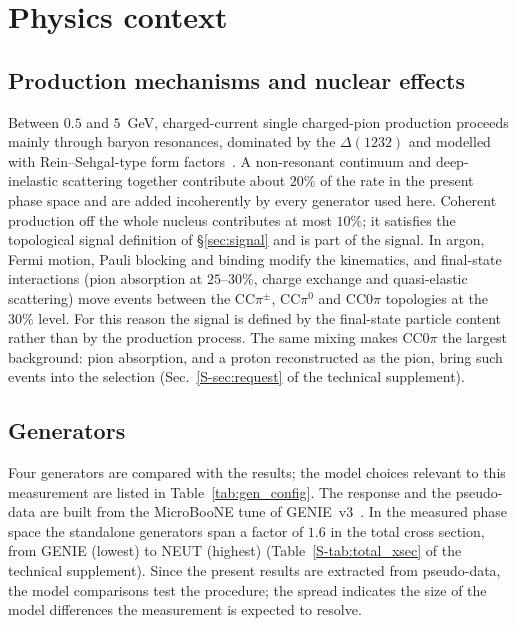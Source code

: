 \documentclass[11pt,a4paper]{article}
\newcommand{\uboone}{MicroBooNE}
\newcommand{\suppref}[2]{#1~\ref{S-#2} of the technical supplement}
\begin{document}
\section{Physics context}
\label{sec:theory}

\subsection{Production mechanisms and nuclear effects}
\label{sec:prod_mechanisms}
\label{sec:fsi}

Between $0.5$ and $5$~GeV, charged-current single charged-pion production proceeds mainly through
baryon resonances, dominated by the $\Delta(1232)$ and modelled with Rein--Sehgal-type form
factors~\cite{rs1981,kuzmin2004,graczyk2008,berger2007,nowak2009}. A non-resonant continuum and
deep-inelastic scattering together contribute about $20\%$ of the rate in the present phase space
and are added incoherently by every generator used here. Coherent production off the whole nucleus
contributes at most $10\%$; it satisfies the topological signal definition of \S\ref{sec:signal}
and is part of the signal. In argon, Fermi motion, Pauli blocking and binding modify the
kinematics, and final-state interactions (pion absorption at $25$--$30\%$, charge exchange and
quasi-elastic scattering) move events between the CC$\pi^{\pm}$, CC$\pi^0$ and CC$0\pi$ topologies
at the $30\%$ level. For this reason the signal is defined by the final-state particle content
rather than by the production process. The same mixing makes CC$0\pi$ the largest background:
pion absorption, and a proton reconstructed as the pion, bring such events into the selection
(\suppref{Sec.}{sec:request}).

\subsection{Generators}
\label{sec:generators}

Four generators are compared with the results; the model choices relevant to this measurement are
listed in Table~\ref{tab:gen_config}. The response and the pseudo-data are built from the \uboone{}
tune of GENIE~v3~\cite{uboone_tune}. In the measured phase space the standalone generators span a
factor of $1.6$ in the total cross section, from GENIE (lowest) to NEUT (highest)
(\suppref{Table}{tab:total_xsec}). Since the present results are extracted
from pseudo-data, the model comparisons test the procedure; the spread indicates the size of the
model differences the measurement is expected to resolve.
\end{document}
